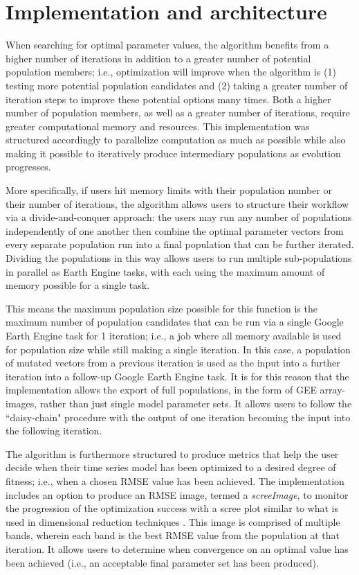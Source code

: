 \documentclass{jors}
\begin{document}
\section*{Implementation and architecture}

When searching for optimal parameter values, the algorithm benefits from a higher number of iterations in addition to a greater number of potential population members; i.e., optimization will improve when the algorithm is (1) testing more potential population candidates and (2) taking a greater number of iteration steps to improve these potential options many times. Both a higher number of population members, as well as a greater number of iterations, require greater computational memory and resources. This implementation was structured accordingly to parallelize computation as much as possible while also making it possible to iteratively produce intermediary populations as evolution progresses.

More specifically, if users hit memory limits with their population number or their number of iterations, the algorithm allows users to structure their workflow via a divide-and-conquer approach: the users may run any number of populations independently of one another then combine the optimal parameter vectors from every separate population run into a final population that can be further iterated. Dividing the populations in this way allows users to run multiple sub-populations in parallel as Earth Engine tasks, with each using the maximum amount of memory possible for a single task.

This means the maximum population size possible for this function is the maximum number of population candidates that can be run via a single Google Earth Engine task for 1 iteration; i.e., a job where all memory available is used for population size while still making a single iteration. In this case, a population of mutated vectors from a previous iteration is used as the input into a further iteration into a follow-up Google Earth Engine task. It is for this reason that the implementation allows the export of full populations, in the form of GEE array-images, rather than just single model parameter sets. It allows users to follow the ``daisy-chain" procedure with the output of one iteration becoming the input into the following iteration.

The algorithm is furthermore structured to produce metrics that help the user  decide when their time series model has been optimized to a desired degree of fitness; i.e., when a chosen RMSE value has been achieved. The implementation includes an option to produce an RMSE image, termed a \emph{screeImage}, to monitor the progression of the optimization success with a scree plot similar to what is used in dimensional reduction techniques \cite{cattell1966scree}. This image is comprised of multiple bands, wherein each band is the best RMSE value from the population at that iteration. It allows users to determine when convergence on an optimal value has been achieved (i.e., an acceptable final parameter set has been produced).
\end{document}
